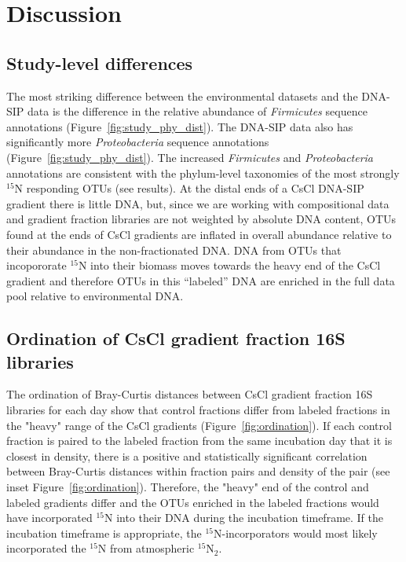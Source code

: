 \section{Discussion}
\subsection{Study-level differences}
The most striking difference between the environmental datasets
\citep{Garcia_Pichel_2013, Steven_2013} and the DNA-SIP data is the difference
in the relative abundance of \textit{Firmicutes} sequence annotations
(Figure~\ref{fig:study_phy_dist}). The DNA-SIP data also has significantly more
\textit{Proteobacteria} sequence annotations (Figure~\ref{fig:study_phy_dist}).
The increased \textit{Firmicutes} and \textit{Proteobacteria} annotations are
consistent with the phylum-level taxonomies of the most strongly $^{15}$N
responding OTUs (see results). At the distal ends of a CsCl DNA-SIP gradient
there is little DNA, but, since we are working with compositional data and
gradient fraction libraries are not weighted by absolute DNA content, OTUs
found at the ends of CsCl gradients are inflated in overall abundance relative
to their abundance in the non-fractionated DNA. DNA from OTUs that incopororate
$^{15}$N into their biomass moves towards the heavy end of the CsCl gradient
and therefore OTUs in this ``labeled'' DNA are enriched in the full data pool
relative to environmental DNA. 

\subsection{Ordination of CsCl gradient fraction 16S libraries}
The ordination of Bray-Curtis distances between CsCl gradient fraction 16S
libraries for each day show that control fractions differ from labeled
fractions in the "heavy" range of the CsCl gradients
(Figure~\ref{fig:ordination}). If each control fraction is paired to the
labeled fraction from the same incubation day that it is closest in density,
there is a positive and statistically significant correlation between
Bray-Curtis distances within fraction pairs and density of the pair (see inset
Figure~\ref{fig:ordination}).  Therefore, the "heavy" end of the control and
labeled gradients differ and the
OTUs enriched in the labeled fractions would have incorporated $^{15}$N into their DNA
during the incubation timeframe. If the incubation timeframe is appropriate,
the $^{15}$N-incorporators would most likely incorporated the $^{15}$N from
atmospheric $^{15}$N$_{2}$.     

